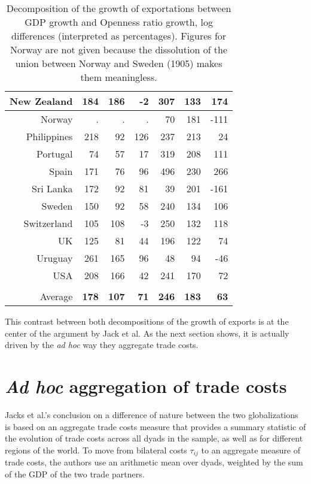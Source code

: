 \documentclass{article}
\begin{document}
\begin{table}
\begin{tabular}{|r|r|r|r|r|r|r|}
\hline
New Zealand & 184 & 186 & -2 & 307 & 133 & 174\\
\hline
Norway & . & . & . & 70 & 181 & -111\\
\hline
Philippines & 218 & 92 & 126 & 237 & 213 & 24\\
\hline
Portugal & 74 & 57 & 17 & 319 & 208 & 111\\
\hline
Spain & 171 & 76 & 96 & 496 & 230 & 266\\
\hline
Sri Lanka & 172 & 92 & 81 & 39 & 201 & -161\\
\hline
Sweden & 150 & 92 & 58 & 240 & 134 & 106\\
\hline
Switzerland & 105 & 108 & -3 & 250 & 132 & 118\\
\hline
UK & 125 & 81 & 44 & 196 & 122 & 74\\
\hline
Uruguay & 261 & 165 & 96 & 48 & 94 & -46\\
\hline
USA & 208 & 166 & 42 & 241 & 170 & 72\\
\hline
 &  &  &  &  &  & \\
\hline
Average & \textbf{178} & \textbf{107} & \textbf{71} & \textbf{246} & \textbf{183} & \textbf{63}\\
\hline
\end{tabular}
\caption{Decomposition of the growth of exportations between
GDP growth and Openness ratio growth, log differences (interpreted as percentages).
Figures for Norway are not given because the dissolution of the
union between Norway and Sweden (1905) makes them
meaningless.}\label{OR}
\end{table}

This contrast between both decompositions of the growth of exports is at the center of the argument by Jack et al. As the next section shows, it is actually driven by the \textit{ad hoc} way they aggregate trade costs.

\section{\label{2} \textit{Ad hoc} aggregation of trade costs}

Jacks et al.'s conclusion on a difference of nature between the
two globalizations is based on an aggregate trade costs
measure that provides a summary statistic of the
evolution of trade costs across all dyads in the sample, as
well as for different regions of the world. To move from
bilateral costs $\tau_{ij}$ to an aggregate measure of trade
costs, the authors use an arithmetic mean over dyads, weighted
by the sum of the GDP of the two trade partners.
\end{document}
